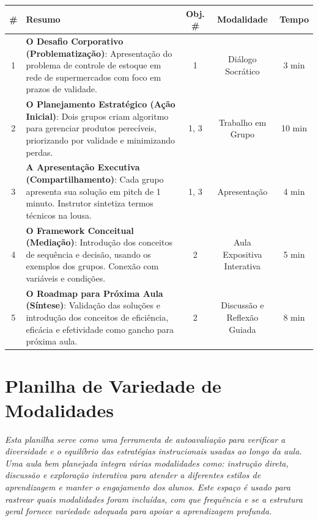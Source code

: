 \documentclass{lesson_plan}
\begin{document}
\begin{center}
\renewcommand{\arraystretch}{1.8}
\setlength{\tabcolsep}{6pt}
\begin{tabular}{|c|p{9cm}|c|c|c|}
\hline
\textbf{\#} & \textbf{Resumo} & \textbf{Obj. \#} & \textbf{Modalidade} & \textbf{Tempo} \\
\hline
\hline
1 & \textbf{O Desafio Corporativo (Problematização)}: Apresentação do problema de controle de estoque em rede de supermercados com foco em prazos de validade. & 1 & Diálogo Socrático & 3 min \\
\hline
2 & \textbf{O Planejamento Estratégico (Ação Inicial)}: Dois grupos criam algoritmo para gerenciar produtos perecíveis, priorizando por validade e minimizando perdas. & 1, 3 & Trabalho em Grupo & 10 min \\
\hline
3 & \textbf{A Apresentação Executiva (Compartilhamento)}: Cada grupo apresenta sua solução em pitch de 1 minuto. Instrutor sintetiza termos técnicos na lousa. & 1, 3 & Apresentação & 4 min \\
\hline
4 & \textbf{O Framework Conceitual (Mediação)}: Introdução dos conceitos de sequência e decisão, usando os exemplos dos grupos. Conexão com variáveis e condições. & 2 & Aula Expositiva Interativa & 5 min \\
\hline
5 & \textbf{O Roadmap para Próxima Aula (Síntese)}: Validação das soluções e introdução dos conceitos de eficiência, eficácia e efetividade como gancho para próxima aula. & 2 & Discussão e Reflexão Guiada & 8 min \\
\hline
\end{tabular}
\end{center}

\vspace{1cm}
\newpage

\section{Planilha de Variedade de Modalidades}
\textit{
Esta planilha serve como uma ferramenta de autoavaliação para verificar a diversidade e o equilíbrio das estratégias instrucionais usadas ao longo da aula. Uma aula bem planejada integra várias modalidades como: instrução direta, discussão e exploração interativa para atender a diferentes estilos de aprendizagem e manter o engajamento dos alunos. Este espaço é usado para rastrear quais modalidades foram incluídas, com que frequência e se a estrutura geral fornece variedade adequada para apoiar a aprendizagem profunda.}
\end{document}
